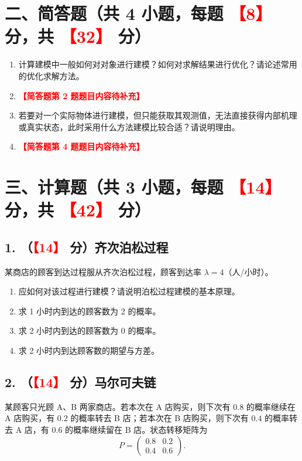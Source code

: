 \documentclass[12pt,a4paper,UTF8,fontset=fandol]{ctexart}
\newcommand{\ph}[1]{\textcolor{red}{\textbf{【#1】}}}
\begin{document}
\section*{二、简答题（共 4 小题，每题 \ph{8} 分，共 \ph{32} 分）}

\begin{enumerate}[label=\textbf{\arabic*.}]
  \item 计算建模中一般如何对对象进行建模？如何对求解结果进行优化？请论述常用的优化求解方法。
  \item \ph{简答题第 2 题题目内容待补充}
  \item 若要对一个实际物体进行建模，但只能获取其观测值，无法直接获得内部机理或真实状态，此时采用什么方法建模比较合适？请说明理由。
  \item \ph{简答题第 4 题题目内容待补充}
\end{enumerate}

\section*{三、计算题（共 3 小题，每题 \ph{14} 分，共 \ph{42} 分）}

\subsection*{1. （\ph{14} 分）齐次泊松过程}

某商店的顾客到达过程服从齐次泊松过程，顾客到达率 $\lambda = 4$（人/小时）。

\begin{enumerate}[label=（\arabic*）]
  \item 应如何对该过程进行建模？请说明泊松过程建模的基本原理。
  \item 求 1 小时内到达的顾客数为 2 的概率。
  \item 求 2 小时内到达的顾客数为 0 的概率。
  \item 求 2 小时内到达顾客数的期望与方差。
\end{enumerate}

\subsection*{2. （\ph{14} 分）马尔可夫链}

某顾客只光顾 A、B 两家商店。若本次在 A 店购买，则下次有 $0.8$ 的概率继续在 A 店购买，有 $0.2$ 的概率转去 B 店；若本次在 B 店购买，则下次有 $0.4$ 的概率转去 A 店，有 $0.6$ 的概率继续留在 B 店。状态转移矩阵为
\[
P = \begin{pmatrix} 0.8 & 0.2 \\ 0.4 & 0.6 \end{pmatrix}.
\]
\end{document}
